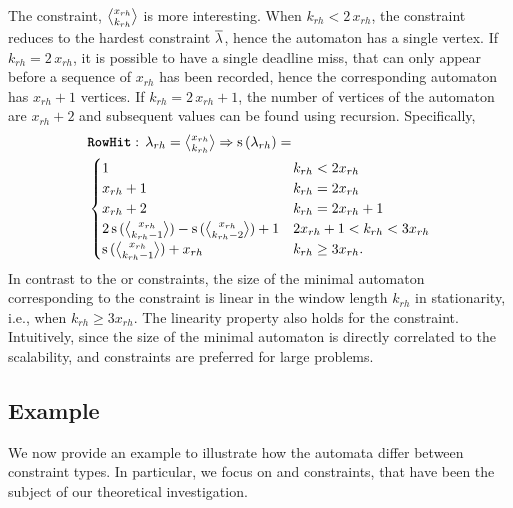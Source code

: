 The \tRH{} constraint, $\rowhit{rh}$ is more interesting.
When $k_{rh} < 2\,x_{rh}$, the constraint reduces to the hardest constraint $\overline{\lambda}$, hence the automaton has a single vertex.
If $k_{rh} = 2\,x_{rh}$, it is possible to have a single deadline miss, that can only appear before a sequence of $x_{rh}$ has been recorded, hence the corresponding automaton has $x_{rh} + 1$ vertices.
If $k_{rh} = 2\,x_{rh} + 1$, the number of vertices of the automaton are $x_{rh} + 2$ and subsequent values can be found using recursion.
Specifically,
\begin{equation*}
    \begin{aligned}
        & \tRH{}: \, \lambda_{rh} = \textstyle\rowhit{rh} \Rightarrow \mathrm{s}\left(\lambda_{rh}\right) = \\
        & \begin{cases}
            1 & k_{rh} < 2x_{rh} \\
            x_{rh}+1 & k_{rh} = 2x_{rh} \\
            x_{rh}+2 & k_{rh} = 2x_{rh}+1 \\
            2\, \mathrm{s}\,(\textstyle \genfrac{<}{>}{0pt}{}{x_{rh}}{k_{rh}-1} ) - 
                \mathrm{s}\,(\textstyle \genfrac{<}{>}{0pt}{}{x_{rh}}{k_{rh}-2} ) + 1 & 2x_{rh} + 1 < k_{rh} < 3x_{rh} \\
            \mathrm{s}\,(\textstyle \genfrac{<}{>}{0pt}{}{x_{rh}}{k_{rh}-1} ) + x_{rh} &k_{rh} \geq 3x_{rh}. \\
        \end{cases}
    \end{aligned}
\end{equation*}
%
In contrast to the \tAH{} or \tAM{} constraints, the size of the minimal automaton corresponding to the \tRH{} constraint is linear in the window length $k_{rh}$ in stationarity, i.e., when $k_{rh} \geq 3x_{rh}$.
The linearity property also holds for the \tRM{} constraint.
Intuitively, since the size of the minimal automaton is directly correlated to the scalability, \tRH{} and \tRM{} constraints are preferred for large problems.

\subsection{Example}%
\label{sec:tool:example}%
%
We now provide an example to illustrate how the automata differ between constraint types. 
In particular, we focus on \tAH{} and \tRH{} constraints, that have been the subject of our theoretical investigation. 


